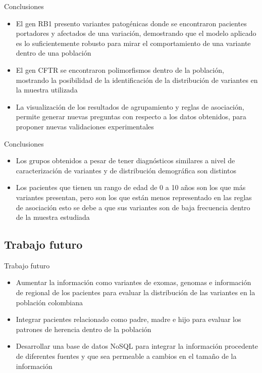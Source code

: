 \documentclass[xcolor=dvipsnames]{beamer}
\begin{document}
\begin{frame}{Conclusiones}
\begin{itemize}
    \justifying
    
     \item El gen RB1 presento variantes patogénicas donde se encontraron pacientes portadores y afectados de una variación, demostrando que el modelo aplicado es lo suficientemente robusto para mirar el comportamiento de una variante dentro de una población
    
    \item El gen CFTR se encontraron polimorfismos dentro de la población, mostrando la posibilidad de la identificación de la distribución de variantes en la muestra utilizada  
    
    \item La visualización de los resultados de agrupamiento  y reglas de asociación, permite generar nuevas preguntas con respecto a los datos obtenidos, para proponer nuevas validaciones experimentales
\end{itemize}	
\end{frame}

\begin{frame}{Conclusiones}
 
 \begin{itemize}
    \justifying
    \item Los grupos obtenidos a pesar de tener diagnósticos similares a nivel de caracterización de variantes y de distribución demográfica son distintos
	\item Los pacientes que tienen un rango de edad de 0 a 10 años son los que más variantes presentan, pero son los que están menos representado en las reglas de asociación esto se debe a que sus variantes son de baja frecuencia dentro de la muestra estudiada
\end{itemize}
\end{frame}

\subsection{Trabajo futuro}
\begin{frame}{Trabajo futuro}
\justifying 
 \begin{itemize}
 \justifying 

	\item Aumentar la información  como variantes de exomas, genomas e información de regional de los pacientes para evaluar la distribución de las variantes en la población colombiana
	
	\item Integrar pacientes relacionado como padre, madre e hijo para evaluar los patrones de herencia dentro de la población

	\item Desarrollar una base de datos NoSQL para integrar la información procedente de diferentes fuentes y que sea permeable a cambios en el tamaño de la información
	
\end{itemize}
\end{frame}
\end{document}

